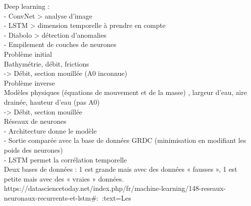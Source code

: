 Deep learning :\\
-	ConvNet > analyse d’image\\
-	LSTM > dimension temporelle à prendre en compte\\
-	Diabolo > détection d’anomalies\\
-	Empilement de couches de neurones\\

Problème initial\\
Bathymétrie, débit, frictions\\
->	Débit, section mouillée (A0 inconnue)\\

Problème inverse\\
Modèles physiques (équations de mouvement et de la masse) , largeur d’eau, aire drainée, hauteur d’eau (pas A0)\\
->	Débit, section mouillée\\

Réseaux de neurones\\
-	Architecture donne le modèle\\
-	Sortie comparée avec la base de données GRDC (minimisation en modifiant les poids des neurones)\\
-	LSTM permet la corrélation temporelle\\

Deux bases de données : 1 est grande mais avec des données « fausses », 1 est petite mais avec des « vraies » données.\\


https://datasciencetoday.net/index.php/fr/machine-learning/148-reseaux-neuronaux-recurrents-et-lstm#:~:text=Les%